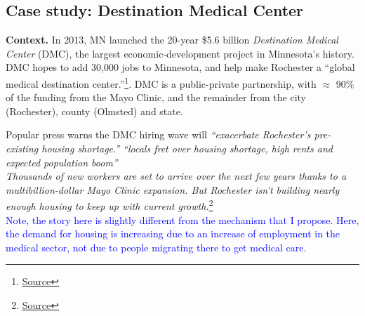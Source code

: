 \documentclass[11pt]{article}
\begin{document}
\subsection*{Case study: Destination Medical Center}

\textbf{Context.}  In 2013, MN  launched the 20-year \$5.6 billion \emph{Destination Medical Center} (DMC), the largest economic‐development project in Minnesota’s history.  DMC hopes to add 30,000 jobs to  Minnesota, and help make Rochester a ``global medical destination center.''\footnote{\href{https://dmc.mn/what-is-dmc/}{Source}}. DMC is a public-private partnership, with $\approx$ 90\% of the funding from the Mayo Clinic, and the remainder from the  city (Rochester), county (Olmsted) and state. 

Popular press warns the DMC hiring wave will \textit{“exacerbate Rochester’s pre-existing housing shortage.”} %
\textit{``locals fret over housing shortage, high rents and expected population boom'' } \\

\textit{Thousands of new workers are set to arrive over the next few years thanks to a multibillion-dollar Mayo Clinic expansion. But Rochester isn’t building nearly enough housing to keep up with current growth.}\footnote{\href{https://www.startribune.com/rochester-has-a-housing-problem-mayo-clinic-may-be-the-answer/600344687}{Source}}
 \\
\textcolor{blue}{Note, the story here is slightly different from the mechanism that I propose. Here, the demand for housing is increasing due to an increase of employment in the medical sector, not due to people migrating there to get medical care. }


\end{document}
